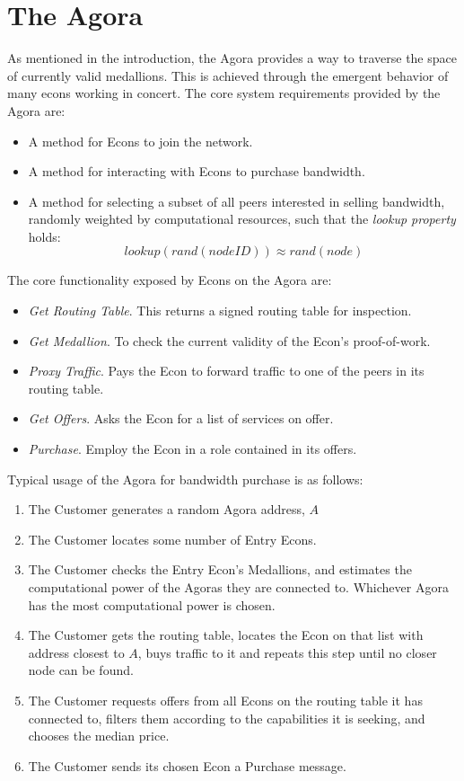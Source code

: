\documentclass{article}
\begin{document}
\section{The Agora}
\label{sec:agora}

As mentioned in the introduction, the Agora provides a way to traverse the space of currently valid medallions. This is achieved through the emergent behavior of many econs working in concert. The core system requirements provided by the Agora are:

\begin{itemize}
    \item A method for Econs to join the network.
    \item A method for interacting with Econs to purchase bandwidth.
    \item A method for selecting a subset of all peers interested in selling bandwidth, randomly weighted by computational resources, such that the \emph{lookup property} holds: $$lookup(rand(nodeID)) \approx rand(node)$$
\end{itemize}

The core functionality exposed by Econs on the Agora are:

\begin{itemize}
    \item \emph{Get Routing Table}. This returns a signed routing table for inspection.
    \item \emph{Get Medallion}. To check the current validity of the Econ's proof-of-work.
    \item \emph{Proxy Traffic}. Pays the Econ to forward traffic to one of the peers in its routing table.
    \item \emph{Get Offers}. Asks the Econ for a list of services on offer.
    \item \emph{Purchase}. Employ the Econ in a role contained in its offers.
\end{itemize}

Typical usage of the Agora for bandwidth purchase is as follows:

\begin{enumerate}
    \item The Customer generates a random Agora address, $A$
    \item The Customer locates some number of Entry Econs.
    \item The Customer checks the Entry Econ's Medallions, and estimates the computational power of the Agoras they are connected to. Whichever Agora has the most computational power is chosen.
    \item The Customer gets the routing table, locates the Econ on that list with address closest to $A$, buys traffic to it and repeats this step until no closer node can be found.
    \item The Customer requests offers from all Econs on the routing table it has connected to, filters them according to the capabilities it is seeking, and chooses the median price.
    \item The Customer sends its chosen Econ a Purchase message.
\end{enumerate}
\end{document}

